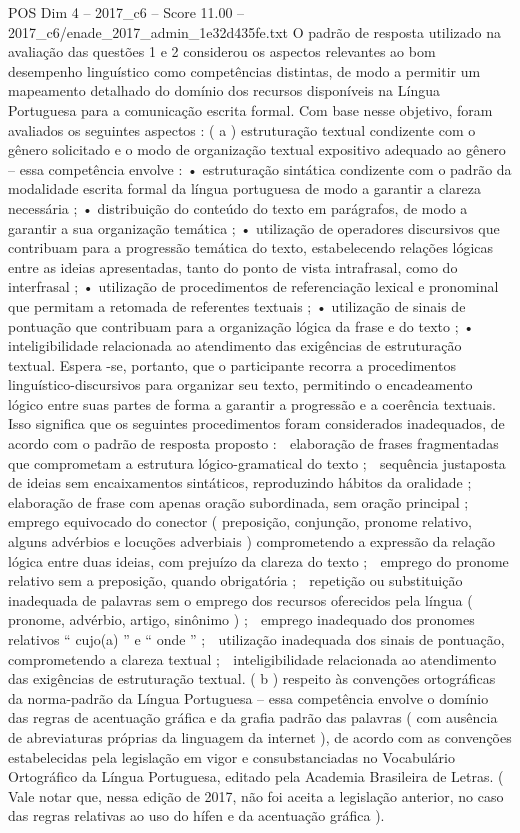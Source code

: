 \begin{textsample}{POS Dim 4 – 2017\_c6 – Score 11.00 – 2017\_c6/enade\_2017\_admin\_1e32d435fe.txt}
O padrão de resposta utilizado na avaliação das questões 1 e 2 considerou os aspectos relevantes ao bom desempenho linguístico como competências distintas, de modo a permitir um mapeamento detalhado do domínio dos recursos disponíveis na Língua Portuguesa para a comunicação escrita formal.
Com base nesse objetivo, foram avaliados os seguintes aspectos : ( a ) estruturação textual condizente com o gênero solicitado e o modo de organização textual expositivo adequado ao gênero – essa competência envolve : • estruturação sintática condizente com o padrão da modalidade escrita formal da língua portuguesa de modo a garantir a clareza necessária ; • distribuição do conteúdo do texto em parágrafos, de modo a garantir a sua organização temática ; • utilização de operadores discursivos que contribuam para a progressão temática do texto, estabelecendo relações lógicas entre as ideias apresentadas, tanto do ponto de vista intrafrasal, como do interfrasal ; • utilização de procedimentos de referenciação lexical e pronominal que permitam a retomada de referentes textuais ; • utilização de sinais de pontuação que contribuam para a organização lógica da frase e do texto ; • inteligibilidade relacionada ao atendimento das exigências de estruturação textual.
Espera -se, portanto, que o participante recorra a procedimentos linguístico-discursivos para organizar seu texto, permitindo o encadeamento lógico entre suas partes de forma a garantir a progressão e a coerência textuais.
Isso significa que os seguintes procedimentos foram considerados inadequados, de acordo com o padrão de resposta proposto :  elaboração de frases fragmentadas que comprometam a estrutura lógico-gramatical do texto ;  sequência justaposta de ideias sem encaixamentos sintáticos, reproduzindo hábitos da oralidade ;  elaboração de frase com apenas oração subordinada, sem oração principal ;  emprego equivocado do conector ( preposição, conjunção, pronome relativo, alguns advérbios e locuções adverbiais ) comprometendo a expressão da relação lógica entre duas ideias, com prejuízo da clareza do texto ;  emprego do pronome relativo sem a preposição, quando obrigatória ;  repetição ou substituição inadequada de palavras sem o emprego dos recursos oferecidos pela língua ( pronome, advérbio, artigo, sinônimo ) ;  emprego inadequado dos pronomes relativos “ cujo(a) ” e “ onde ” ;  utilização inadequada dos sinais de pontuação, comprometendo a clareza textual ;  inteligibilidade relacionada ao atendimento das exigências de estruturação textual. ( b ) respeito às convenções ortográficas da norma-padrão da Língua Portuguesa – essa competência envolve o domínio das regras de acentuação gráfica e da grafia padrão das palavras ( com ausência de abreviaturas próprias da linguagem da internet ), de acordo com as convenções estabelecidas pela legislação em vigor e consubstanciadas no Vocabulário Ortográfico da Língua Portuguesa, editado pela Academia Brasileira de Letras. ( Vale notar que, nessa edição de 2017, não foi aceita a legislação anterior, no caso das regras relativas ao uso do hífen e da acentuação gráfica ).

\end{textsample}
